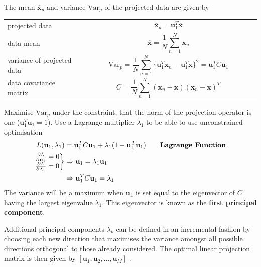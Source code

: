 \documentclass[11pt]{article}
\theoremstyle{definition}
\newcommand*\samplemean[1]{\overline{#1}}
\begin{document}
The mean $\overline{\textbf{x}}_p$ and variance $\text{Var}_p$ of the projected data are given by
\begin{tabularx}{\linewidth}{m{0.3\linewidth} m{0.7\linewidth}}
	projected data & \[ \samplemean{\textbf{x}}_p = \textbf{u}_1^T\samplemean{\textbf{x}} \]\\
	data mean & \[ \samplemean{\textbf{x}} = \frac{1}{N}\sum_{n=1}^{N}\textbf{x}_n \]\\
	variance of projected data & \[\text{Var}_p = \frac{1}{N}\sum_{n=1}^{N}\{\textbf{u}_1^T\textbf{x}_n - \textbf{u}_1^T\samplemean{\textbf{x}}\}^2 = \textbf{u}_1^T C \textbf{u}_1 \]\\
	data covariance matrix & \[ C = \frac{1}{N}\sum_{n=1}^{N}(\textbf{x}_n - \samplemean{\textbf{x}})(\textbf{x}_n - \samplemean{\textbf{x}})^T \]
\end{tabularx}
\noindent
Maximise $\text{Var}_p$ under the constraint, that the norm of the projection operator is one ($\textbf{u}_1^T\textbf{u}_1 = 1$). Use a Lagrange multiplier $\lambda_1$ to be able to use unconstrained optimisation
\begin{align*}
	 L(\textbf{u}_1, \lambda_1) &= \textbf{u}_1^T C \textbf{u}_1 + \lambda_1(1 - \textbf{u}_1^T\textbf{u}_1) \tag*{\textbf{Lagrange Function}}\\
	\left.\begin{matrix}\frac{\partial L}{\partial \textbf{u}_1} = 0\\ \frac{\partial L}{\partial \lambda_1} = 0\end{matrix}\right\} &\Rightarrow \textbf{u}_1 = \lambda_1\textbf{u}_1\\
	&\Rightarrow \textbf{u}_1^T C \textbf{u}_1 = \lambda_1
\end{align*}
The variance will be a maximum when $\textbf{u}_1$ is set equal to the eigenvector of $C$ having the largest eigenvalue $\lambda_1$. This eigenvector is known as the \textbf{first principal component}.

Additional principal components $\lambda_k$ can be defined in an incremental fashion by choosing each new direction that maximises the variance amongst all possible directions orthogonal to those already considered. The optimal linear projection matrix is then given by $[\textbf{u}_1,\textbf{u}_2,\dots,\textbf{u}_M]$ \parencite[p. 561-565]{bishop2006pattern}.
\end{document}
